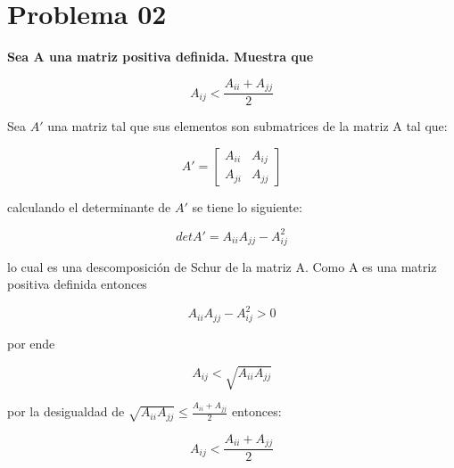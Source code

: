\section*{Problema 02}

\textbf{Sea A una matriz positiva definida. Muestra que}

\begin{equation*}
    A_{ij} < \frac{A_{ii}+A_{jj}}{2}
\end{equation*}


Sea $A'$ una matriz tal que sus elementos son submatrices de la matriz A tal que:

\begin{equation*}
    A' = \begin{bmatrix}
        A_{ii} & A_{ij} \\
        A_{ji} & A_{jj}
    \end{bmatrix}
\end{equation*}

calculando el determinante de $A'$ se tiene lo siguiente:

\begin{equation*}
    det A' = A_{ii}A_{jj} - A_{ij}^2
\end{equation*}

lo cual es una descomposición de Schur de la matriz A. Como A es una matriz positiva definida entonces

\begin{equation*}
    A_{ii}A_{jj} - A_{ij}^2 > 0
\end{equation*}

por ende

\begin{equation*}
    A_{ij} < \sqrt{A_{ii}A_{jj}}
\end{equation*}

por la desigualdad de $\sqrt{A_{ii}A_{jj}} \leq \frac{A_{ii}+A_{jj}}{2}$ entonces:

\begin{equation*}
    A_{ij} < \frac{A_{ii}+A_{jj}}{2}
\end{equation*}